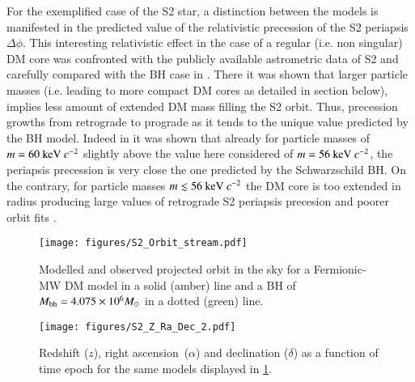 \documentclass[twocolumn]{aa}
\begin{document}
For the exemplified case of the S2 star, a distinction between the models is manifested in the predicted value of the relativistic precession of the S2 periapsis $\Delta \phi$. This interesting relativistic effect in the case of a regular (i.e. non singular) DM core was confronted with the publicly available astrometric data of S2 and carefully compared with the BH case in \cite{2022MNRAS.511L..35A}. There it was shown that larger particle masses (i.e. leading to more compact DM cores as detailed in section below), implies less amount of extended DM mass filling the S2 orbit. Thus, precession growths from retrograde to prograde as it tends to the unique value predicted by the BH model. Indeed in \cite{2022MNRAS.511L..35A} it was shown that already for particle masses of $m = 60~{\rm keV}~c^{-2}$ slightly above the value here considered of $m=56~{\rm keV}~c^{-2}$, the periapsis precession is very close the one predicted by the Schwarzschild BH. On the contrary, for particle masses $m\lesssim 56~{\rm keV}~c^{-2}$ the DM core is too extended in radius producing large values of retrograde S2 periapsis precesion and poorer orbit fits \cite{2020A&A...641A..34B,2022MNRAS.511L..35A}. %
%
%
\begin{figure}
   \texttt{[image: figures/S2\_Orbit\_stream.pdf]}
\caption{Modelled and observed projected orbit in the sky for a Fermionic-MW DM model in a solid (amber) line and a BH of $M_{\rm bh}=4.075\times 10^6 M_\odot$ in a dotted (green) line.}
   \label{fig:S2_fit}
\end{figure}

\begin{figure}
   \texttt{[image: figures/S2\_Z\_Ra\_Dec\_2.pdf]}
   \caption{Redshift ($z$), right ascension~($\alpha$) and declination ($\delta$) as a function of time epoch for the same models
   displayed in \cref{fig:S2_fit}.}
   \label{fig:S2_fit_b}
\end{figure}
\end{document}
